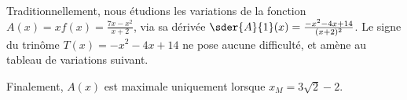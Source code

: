 Traditionnellement, nous étudions les variations de la fonction
$A(x) = x f(x) = \frac{7 x - x^2}{x + 2}$, via sa dérivée
$\sder{A}{1}(x) = \frac{- x^2 - 4 x + 14}{(x + 2)^2}$.
%
Le signe du trinôme $T(x) = - x^2 - 4 x + 14$ ne pose aucune difficulté, et amène au tableau de variations suivant.

\begin{center}
\end{center}

Finalement,
$A(x)$ est maximale uniquement lorsque $x_M = 3 \sqrt{2} - 2$.